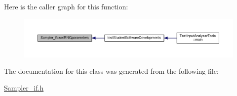 Here is the caller graph for this function\-:\nopagebreak
\begin{figure}[H]
\begin{center}
\leavevmode
\includegraphics[width=350pt]{class_sampler__if_a630a0cbbef6e49869063530b03d3bb35_icgraph}
\end{center}
\end{figure}




The documentation for this class was generated from the following file\-:\begin{DoxyCompactItemize}
\item 
\hyperlink{_sampler__if_8h}{Sampler\-\_\-if.\-h}\end{DoxyCompactItemize}
